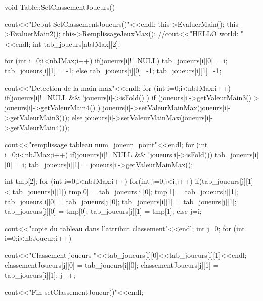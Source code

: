 \documentclass{article}
\begin{document}
void Table::SetClassementJoueurs()
{
  cout<<"Debut SetClassementJoueurs()"<<endl;
  this->EvaluerMain();
  this->EvaluerMain2();
  this->RemplissageJeuxMax();
  //cout<<"HELLO world: "<<endl;
  int tab_joueurs[nbJMax][2];
  
  for (int i=0;i<nbJMax;i++)
    {
	  if(joueurs[i]!=NULL){
	    tab_joueurs[i][0] = i;
	    tab_joueurs[i][1] = -1;
	  }
	  else{
	    tab_joueurs[i][0]=-1;
	    tab_joueurs[i][1]=-1;
	  }
    }
  
  cout<<"Detection de la main max"<<endl;
  for (int i=0;i<nbJMax;i++)
	{
	  if(joueurs[i]!=NULL && !joueurs[i]->isFold() ){
	    if (joueurs[i]->getValeurMain3() > joueurs[i]->getValeurMain4() )
	    joueurs[i]->setValeurMainMax(joueurs[i]->getValeurMain3());
	    else
	      joueurs[i]->setValeurMainMax(joueurs[i]->getValeurMain4());
	  }
	}
  
  cout<<"remplissage tableau num_joueur_point"<<endl;
  for (int i=0;i<nbJMax;i++)
    {
      if(joueurs[i]!=NULL && !joueurs[i]->isFold()){
	  tab_joueurs[i][0] = i;
	  tab_joueurs[i][1] = joueurs[i]->getValeurMainMax();
	}
    }

  int tmp[2];
  for (int i=0;i<nbJMax;i++)
    {
      for(int j=0;j<i;j++){
	if(tab_joueurs[j][1] < tab_joueurs[i][1])
	  {
	    tmp[0] = tab_joueurs[i][0];
	    tmp[1] = tab_joueurs[i][1];
	    tab_joueurs[i][0] = tab_joueurs[j][0];
	    tab_joueurs[i][1] = tab_joueurs[j][1];
	    tab_joueurs[j][0] = tmp[0];
	    tab_joueurs[j][1] = tmp[1];
	  }
	else{
	  j=i;
	}
      }
    }
  
  cout<<"copie du tableau dans l'attribut classement"<<endl;
  int j=0;
  for (int i=0;i<nbJoueur;i++)
    {
      cout<<"Classement joueurs "<<tab_joueurs[i][0]<<tab_joueurs[i][1]<<endl;
      classementJoueurs[j][0] = tab_joueurs[i][0];
      classementJoueurs[j][1] = tab_joueurs[i][1];
      j++;
     
    }
  
  cout<<"Fin setClassementJoueur()"<<endl;
}
\end{document}
